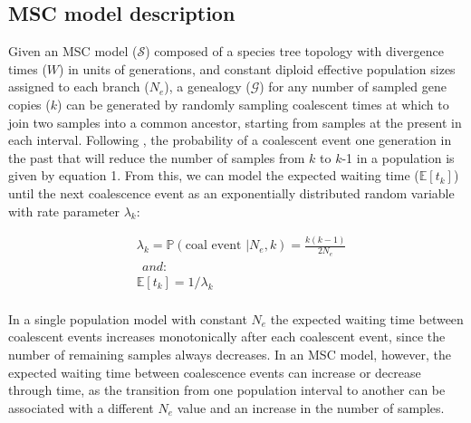\documentclass[11pt]{article}
\begin{document}
\subsection{MSC model description}
Given an MSC model ($\mathcal{S}$) composed of a species tree topology with divergence
times ($W$) in units of generations, and constant diploid effective population sizes
assigned to each branch ($N_e$), a genealogy ($\mathcal{G}$) 
for any number of sampled gene copies ($k$) can be generated by randomly sampling 
coalescent times %
at which to join two samples into a common ancestor, 
starting from samples at the present in each interval. 
Following \citet{kingman1982coalescent}, the probability of a 
coalescent event one generation in the past that will reduce the 
number of samples from $k$ to $k$-1 in a population
is given by equation 1. From this, we can model the expected 
waiting time ($\mathbb{E}[t_k]$) until the next coalescence event as an 
exponentially distributed random variable with rate parameter $\lambda_k$:

\begin{equation}
\begin{aligned}
	&\lambda_k = \mathbb{P}(\text{coal~event~} | N_e,k) = \frac{k(k-1)}{2N_e}
	\\
	&~~and:
	\\[0.15cm]
	&\mathbb{E}[t_k] = 1 / \lambda_k
	\\[0.15cm]	
\end{aligned}
\end{equation}

\noindent In a single population model
with constant $N_e$ the expected waiting time between coalescent events 
increases monotonically after each coalescent event, since the number of 
remaining samples always decreases. In an MSC model, 
however, the expected waiting time between coalescence events can increase or 
decrease through time, as the transition from one population interval to another 
can be associated with a different $N_e$ value and an increase in the number 
of samples.
\end{document}
